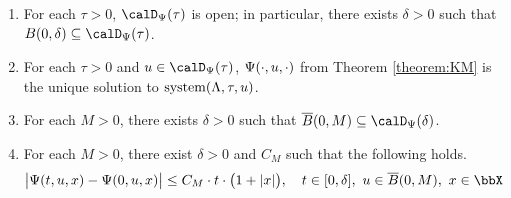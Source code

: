 \begin{proposition}
  \label{proposition:real-moments-revisit}
  \begin{enumerate}[label=(\alph*)]
    \item
      \label{proposition:real-moments-revisit:big-time-small-moments}
      For each $\tau > 0$, $\momentSpace(\tau)$ is open; in particular, there exists $\delta > 0$ such that $\ball{0}{\delta} \subseteq \momentSpace(\tau)$.
    \item
      \label{proposition:real-moments-revisit:aff-unique}
      For each $\tau > 0$ and $\momentVar \in \momentSpace(\tau)$, $\Psi(\cdot,u,\cdot)$ from Theorem \ref{theorem:KM} is the unique solution to $\operatorname{system}(\Lambda, \tau, u)$.
    \item
      \label{proposition:real-moments-revisit:big-moments-small-time}
      For each $M > 0$, there exists $\delta > 0$ such that $\closedBall{0}{M} \subseteq \momentSpace(\delta)$.
    \item
      \label{proposition:real-moments-revisit:aff-uniform-bound}
      For each $M > 0$, there exist $\delta > 0$ and $C_M$ such that the following holds.
      \begin{equation*}
        \big| \aff(t, \momentVar, \stateVar) - \aff(0, \momentVar, \stateVar) \big| \leq C_M \cdot t \cdot \big( 1 + |\stateVar| \big), \quad t \in [0,\delta], ~ \momentVar \in \closedBall{0}{M}, ~ \stateVar \in \stateSpace
      \end{equation*}
  \end{enumerate}
\end{proposition}
